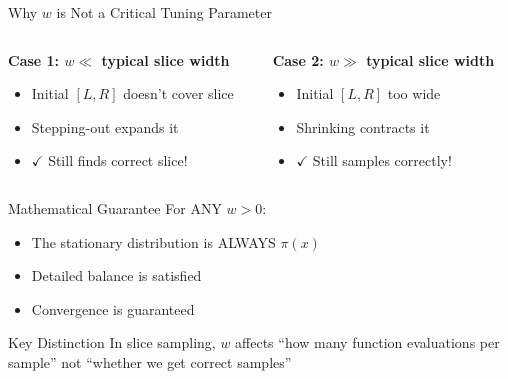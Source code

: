 \documentclass[aspectratio=169]{beamer}
\begin{document}
\begin{frame}{Why $w$ is Not a Critical Tuning Parameter}
	\begin{columns}[T]
		\begin{column}{0.48\textwidth}
			\textbf{Case 1: $w \ll$ typical slice width}
			\begin{itemize}
				\item Initial $[L, R]$ doesn't cover slice
				\item Stepping-out expands it
				\item $\checkmark$ Still finds correct slice!
			\end{itemize}
		\end{column}
		\begin{column}{0.48\textwidth}
			\textbf{Case 2: $w \gg$ typical slice width}
			\begin{itemize}
				\item Initial $[L, R]$ too wide
				\item Shrinking contracts it
				\item $\checkmark$ Still samples correctly!
			\end{itemize}
		\end{column}
	\end{columns}

	\begin{block}{Mathematical Guarantee}
		For ANY $w > 0$:
		\begin{itemize}
			\item The stationary distribution is ALWAYS $\pi(x)$
			\item Detailed balance is satisfied
			\item Convergence is guaranteed
		\end{itemize}
	\end{block}

	\begin{alertblock}{Key Distinction}
		In slice sampling, $w$ affects ``how many function evaluations per sample'' not ``whether we get correct samples''
	\end{alertblock}

\end{frame}
\end{document}
